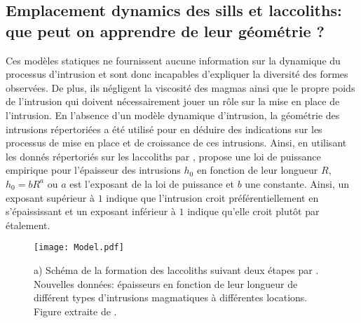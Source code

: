 \subsection{Emplacement dynamics des sills  et laccoliths: que peut on
  apprendre de leur géométrie ?}
\label{sec:empl-dynam-des}

Ces  modèles  statiques  ne  fournissent  aucune  information  sur  la
dynamique du processus d'intrusion et sont donc incapables d'expliquer
la diversité des formes observées. De plus, ils négligent la viscosité
des  magmas ainsi  que  le  propre poids  de  l'intrusion qui  doivent
nécessairement jouer un rôle sur la  mise en place de l'intrusion.  En
l'absence  d'un   modèle  dynamique  d'intrusion,  la   géométrie  des
intrusions répertoriées a été utilisé  pour en déduire des indications
sur les processus de mise en place et de croissance de ces intrusions.
Ainsi,  en utilisant  les donnés  répertoriés sur  les laccoliths  par
\citet{E:2015tl},   \citet{McCaffrey:1997ea}   propose  une   loi   de
puissance empirique pour l'épaisseur  des intrusions $h_0$ en fonction
de leur longueur $R$, $h_0 = bR^a$  ou $a$ est l'exposant de la loi de
puissance et  $b$ une  constante. Ainsi, un  exposant supérieur  à $1$
indique que l'intrusion croit  préférentiellement en s'épaississant et
un  exposant  inférieur  à  $1$   indique  qu'elle  croit  plutôt  par
étalement.

\begin{figure}[h!]
  \begin{center}
    \graphicspath{ {/Users/thorey/Documents/These/Manuscript/Figure/Chapter1/} }
    \texttt{[image: Model.pdf]}
    \caption{a)  Schéma de  la formation  des laccoliths  suivant deux
      étapes   par   \citet{McCaffrey:1997ea}.    Nouvelles   données:
      épaisseurs  en  fonction de  leur  longueur  de différent  types
      d'intrusions  magmatiques   à  différentes   locations.   Figure
      extraite de \citet{Cruden:tg}.}
    \label{Model}
  \end{center}
\end{figure}

